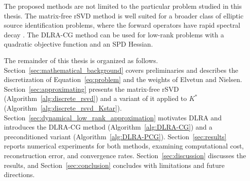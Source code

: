 The proposed methods are not limited to the particular problem studied in this thesis. The matrix-free rSVD method is well suited for a broader class of elliptic source identification problems, where the forward operators have rapid spectral decay \cite{evansPartialDifferentialEquations2010,engl1996regularization}. The DLRA-CG method can be used for low-rank problems with a quadratic objective function and an SPD Hessian.

The remainder of this thesis is organized as follows. Section~\ref{sec:mathematical_background} covers preliminaries and describes the discretization of Equation~\eqref{eq:problem} and the weights of Elvetun and Nielsen. Section~\ref{sec:approximating} presents the matrix-free rSVD (Algorithm~\ref{alg:discrete_rsvd}) and a variant of it applied to $K^*$ (Algorithm~\ref{alg:discrete_rsvd_Kstar}). Section~\ref{sec:dynamical_low_rank_approximation} motivates DLRA and introduces the DLRA-CG method (Algorithm~\ref{alg:DLRA-CG}) and a preconditioned variant (Algorithm~\ref{alg:DLRA-PCG}). Section~\ref{sec:results} reports numerical experiments for both methods, examining computational cost, reconstruction error, and convergence rates. Section~\ref{sec:discussion} discusses the results, and Section~\ref{sec:conclusion} concludes with limitations and future directions.
